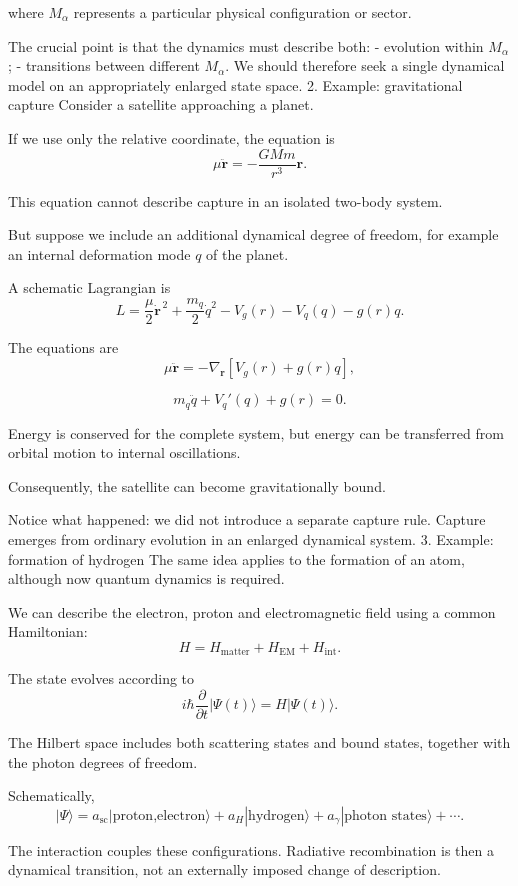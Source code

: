where \(M_\alpha\) represents a particular physical configuration or sector.

The crucial point is that the dynamics must describe both:
- evolution within \(M_\alpha\);
- transitions between different \(M_\alpha\).
We should therefore seek a single dynamical model on an appropriately enlarged state space.
2. Example: gravitational capture
Consider a satellite approaching a planet.

If we use only the relative coordinate, the equation is
\[
\mu\ddot{\mathbf r}
=-\frac{GMm}{r^3}\mathbf r.
\]

This equation cannot describe capture in an isolated two-body system.

But suppose we include an additional dynamical degree of freedom, for example an internal deformation mode \(q\) of the planet.

A schematic Lagrangian is
\[
L=
\frac{\mu}{2}\dot{\mathbf r}^{\,2}
+\frac{m_q}{2}\dot q^2
-V_g(r)-V_q(q)-g(r)q.
\]

The equations are
\[
\mu\ddot{\mathbf r}
=-\nabla_{\mathbf r}
\left[V_g(r)+g(r)q\right],
\]

\[
m_q\ddot q+V_q'(q)+g(r)=0.
\]

Energy is conserved for the complete system, but energy can be transferred from orbital motion to internal oscillations.

Consequently, the satellite can become gravitationally bound.

Notice what happened: we did not introduce a separate capture rule. Capture emerges from ordinary evolution in an enlarged dynamical system.
3. Example: formation of hydrogen
The same idea applies to the formation of an atom, although now quantum dynamics is required.

We can describe the electron, proton and electromagnetic field using a common Hamiltonian:
\[
H=H_{\mathrm{matter}}+H_{\mathrm{EM}}+H_{\mathrm{int}}.
\]

The state evolves according to
\[
i\hbar\frac{\partial}{\partial t}|\Psi(t)\rangle
=H|\Psi(t)\rangle.
\]

The Hilbert space includes both scattering states and bound states, together with the photon degrees of freedom.

Schematically,
\[
|\Psi\rangle
=
a_{\mathrm{sc}}|\text{proton,electron}\rangle
+
a_H|\text{hydrogen}\rangle
+
a_\gamma|\text{photon states}\rangle+\cdots.
\]

The interaction couples these configurations. Radiative recombination is then a dynamical transition, not an externally imposed change of description.

